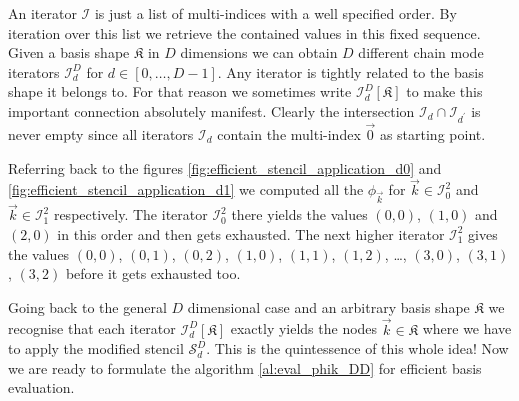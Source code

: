 \begin{definition}
  An iterator $\mathcal{I}$ is just a list of multi-indices with a well specified order.
  By iteration over this list we retrieve the contained values in this fixed sequence.
  Given a basis shape $\mathfrak{K}$ in $D$ dimensions we can obtain $D$ different chain
  mode iterators $\mathcal{I}^D_d$ for $d \in [0, \ldots, D-1]$. Any iterator
  is tightly related to the basis shape it belongs to. For that reason we sometimes write
  $\mathcal{I}^D_d[\mathfrak{K}]$ to make this important connection absolutely manifest.
  Clearly the intersection $\mathcal{I}_d \cap \mathcal{I}_{d^\prime}$ is never empty
  since all iterators $\mathcal{I}_d$ contain the multi-index $\vec{0}$ as starting point.
\end{definition}

Referring back to the figures \ref{fig:efficient_stencil_application_d0} and \ref{fig:efficient_stencil_application_d1}
we computed all the $\phi_{\vec{k}}$ for $\vec{k} \in \mathcal{I}^2_0$ and $\vec{k} \in \mathcal{I}^2_1$
respectively. The iterator $\mathcal{I}^2_0$ there yields the values $(0,0)$, $(1,0)$ and $(2,0)$
in this order and then gets exhausted. The next higher iterator $\mathcal{I}^2_1$ gives the values
$(0,0)$, $(0,1)$, $(0,2)$, $(1,0)$, $(1,1)$, $(1,2)$, \ldots, $(3,0)$, $(3,1)$, $(3,2)$ before it
gets exhausted too.

Going back to the general $D$ dimensional case and an arbitrary basis shape $\mathfrak{K}$
we recognise that each iterator $\mathcal{I}^D_d[\mathfrak{K}]$ exactly yields the nodes
$\vec{k} \in \mathfrak{K}$ where we have to apply the modified stencil $\mathcal{S}^D_d$.
This is the quintessence of this whole idea! Now we are ready to formulate the algorithm
\ref{al:eval_phik_DD} for efficient basis evaluation.

